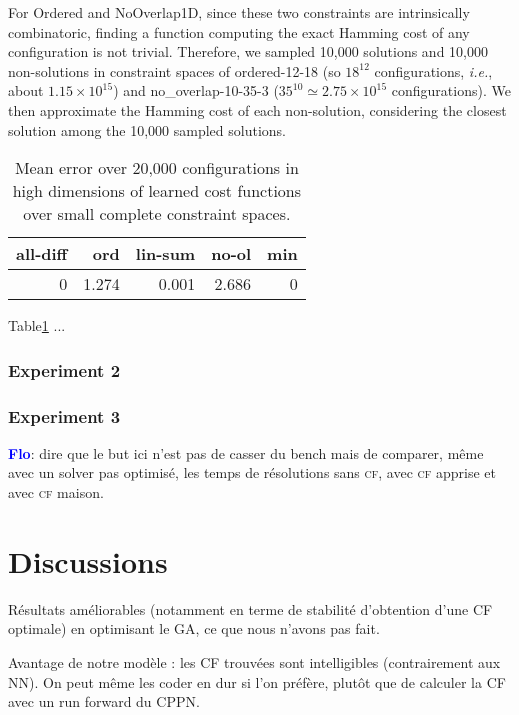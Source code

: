 \documentclass{article}
\newcommand{\ie}{\textit{i.e.}}
\newcommand{\cf}{\textsc{cf}\xspace}
\newcommand{\flo}{\textcolor{blue}{\bf Flo}\xspace}
\begin{document}
For  Ordered   and  NoOverlap1D,  since  these   two  constraints  are
intrinsically  combinatoric, finding  a function  computing the  exact
Hamming  cost of  any  configuration is  not  trivial.  Therefore,  we
sampled 10,000 solutions and 10,000 non-solutions in constraint spaces
of   ordered-12-18   (so    $18^{12}$   configurations,   \ie,   about
$1.15\times         10^{15}$)          and         no\_overlap-10-35-3
($35^{10}  \simeq   2.75\times  10^{15}$  configurations).    We  then
approximate  the Hamming  cost of  each non-solution,  considering the
closest solution among the 10,000 sampled solutions.

\begin{table}
  \centering
\begin{tabular}{|r|r|r|r|r|}
  \hline
  all-diff & ord & lin-sum & no-ol & min\\
  \hline
  0 & 1.274 & 0.001 & 2.686 & 0\\
  \hline
\end{tabular}
\caption{Mean error  over 20,000 configurations in  high dimensions of
  learned cost functions over small complete constraint spaces.}
\label{tab:cf_scale}
\end{table}

Table\ref{tab:cf_scale} ...

\subsubsection{Experiment 2}

\subsubsection{Experiment 3}
\flo:  dire que  le but  ici  n'est pas  de  casser du  bench mais  de
comparer, même avec un solver  pas optimisé, les temps de résolutions
sans \cf, avec \cf apprise et avec \cf maison.

\section{Discussions}

Résultats améliorables  (notamment en  terme de  stabilité d'obtention
d'une CF optimale) en optimisant le GA, ce que nous n'avons pas fait.

Avantage  de  notre  modèle  :  les  CF  trouvées  sont  intelligibles
(contrairement aux NN). On peut même les coder en dur si l'on préfère,
plutôt que de calculer la CF avec un run forward du CPPN.
\end{document}
